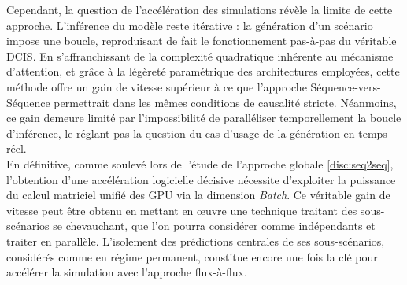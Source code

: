 Cependant, la question de l'accélération des simulations révèle la limite de cette approche. L'inférence du modèle reste itérative : la génération d'un scénario impose une boucle, reproduisant de fait le fonctionnement pas-à-pas du véritable DCIS. En s'affranchissant de la complexité quadratique inhérente au mécanisme d'attention, et grâce à la légèreté paramétrique des architectures employées, cette méthode offre un gain de vitesse supérieur à ce que l'approche Séquence-vers-Séquence permettrait dans les mêmes conditions de causalité stricte. Néanmoins, ce gain demeure limité par l'impossibilité de paralléliser temporellement la boucle d'inférence, le réglant pas la question du cas d'usage de la génération en temps réel.\\

En définitive, comme soulevé lors de l'étude de l'approche globale \ref{disc:seq2seq}, l'obtention d'une accélération logicielle décisive nécessite d'exploiter la puissance du calcul matriciel unifié des GPU via la dimension \textit{Batch}. Ce véritable gain de vitesse peut être obtenu en mettant en œuvre une technique traitant des sous-scénarios se chevauchant, que l'on pourra considérer comme indépendants et traiter en parallèle. L'isolement des prédictions centrales de ses sous-scénarios, considérés comme en régime permanent, constitue encore une fois la clé pour accélérer la simulation avec l'approche flux-à-flux.

